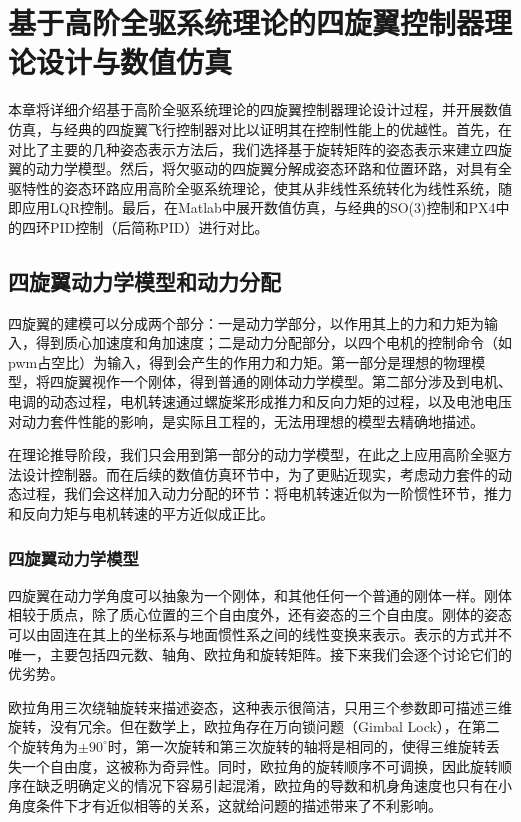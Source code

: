\chapter{基于高阶全驱系统理论的四旋翼控制器理论设计与数值仿真}  
本章将详细介绍基于高阶全驱系统理论的四旋翼控制器理论设计过程，并开展数值仿真，与经典的四旋翼飞行控制器对比以证明其在控制性能上的优越性。首先，在对比了主要的几种姿态表示方法后，我们选择基于旋转矩阵的姿态表示来建立四旋翼的动力学模型。然后，将欠驱动的四旋翼分解成姿态环路和位置环路，对具有全驱特性的姿态环路应用高阶全驱系统理论，使其从非线性系统转化为线性系统，随即应用LQR控制。最后，在Matlab中展开数值仿真，与经典的SO(3)控制和PX4中的四环PID控制（后简称PID）进行对比。

\section{四旋翼动力学模型和动力分配}
四旋翼的建模可以分成两个部分：一是动力学部分，以作用其上的力和力矩为输入，得到质心加速度和角加速度；二是动力分配部分，以四个电机的控制命令（如pwm占空比）为输入，得到会产生的作用力和力矩。第一部分是理想的物理模型，将四旋翼视作一个刚体，得到普通的刚体动力学模型。第二部分涉及到电机、电调的动态过程，电机转速通过螺旋桨形成推力和反向力矩的过程，以及电池电压对动力套件性能的影响，是实际且工程的，无法用理想的模型去精确地描述。

在理论推导阶段，我们只会用到第一部分的动力学模型，在此之上应用高阶全驱方法设计控制器。而在后续的数值仿真环节中，为了更贴近现实，考虑动力套件的动态过程，我们会这样加入动力分配的环节：将电机转速近似为一阶惯性环节，推力和反向力矩与电机转速的平方近似成正比。

\subsection*{四旋翼动力学模型}
四旋翼在动力学角度可以抽象为一个刚体，和其他任何一个普通的刚体一样。刚体相较于质点，除了质心位置的三个自由度外，还有姿态的三个自由度。刚体的姿态可以由固连在其上的坐标系与地面惯性系之间的线性变换来表示。表示的方式并不唯一，主要包括四元数、轴角、欧拉角和旋转矩阵\cite{attitude}。接下来我们会逐个讨论它们的优劣势。


欧拉角用三次绕轴旋转来描述姿态，这种表示很简洁，只用三个参数即可描述三维旋转，没有冗余。但在数学上，欧拉角存在万向锁问题（Gimbal Lock），在第二个旋转角为$\pm 90^{\circ}$时，第一次旋转和第三次旋转的轴将是相同的，使得三维旋转丢失一个自由度，这被称为奇异性。同时，欧拉角的旋转顺序不可调换，因此旋转顺序在缺乏明确定义的情况下容易引起混淆，欧拉角的导数和机身角速度也只有在小角度条件下才有近似相等的关系，这就给问题的描述带来了不利影响。

